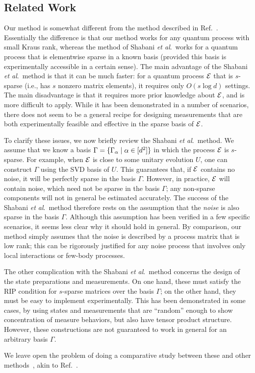 \subsection{Related Work\label{S:process-related-work}}


Our method is somewhat different from the method described in Ref.~\cite{Shabani2011}. Essentially the difference is that our method works for any quantum process with small Kraus rank, whereas the method of Shabani \textit{et al}.\ works for a quantum process that is elementwise sparse in a known basis (provided this basis is experimentally accessible in a certain sense). The main advantage of the Shabani \textit{et al}.\ method is that it can be much faster: for a quantum process $\mathcal{E}$ that is $s$-sparse (i.e., has $s$ nonzero matrix elements), it requires only $O(s\log d)$ settings. The main disadvantage is that it requires more prior knowledge about $\mathcal{E}$, and is more difficult to apply.  While it has been demonstrated in a number of scenarios, there does not seem to be a general recipe for designing measurements that are both experimentally feasible and effective in the sparse basis of $\mathcal{E}$.

To clarify these issues, we now briefly review the Shabani \textit{et al}.\ method.  We assume that we know a basis $\Gamma = \lbrace \Gamma_\alpha \;|\; \alpha \in [d^2] \rbrace$ in which the process $\mathcal{E}$ is $s$-sparse.  For example, when $\mathcal{E}$ is close to some unitary evolution $U$, one can construct $\Gamma$ using the SVD basis of $U$.  This guarantees that, if $\mathcal{E}$ contains no noise, it will be perfectly sparse in the basis $\Gamma$. However, in practice, $\mathcal{E}$ will contain noise, which need not be sparse in the basis $\Gamma$; any non-sparse components will not in general be estimated accurately.  The success of the Shabani \textit{et al}.\ method therefore rests on the assumption that the \textit{noise} is also sparse in the basis $\Gamma$. Although this assumption has been verified in a few specific scenarios, it seems less clear why it should hold in general. By comparison, our method simply assumes that the noise is described by a process matrix that is low rank; this can be rigorously justified for any noise process that involves only local interactions or few-body processes.

The other complication with the Shabani \textit{et al}.\ method concerns the design of the state preparations and measurements. On one hand, these must satisfy the RIP condition for $s$-sparse matrices over the basis $\Gamma$; on the other hand, they must be easy to implement experimentally. This has been demonstrated in some cases, by using states and measurements that are ``random'' enough to show concentration of measure behaviors, but also have tensor product structure. However, these constructions are not guaranteed to work in general for an arbitrary basis $\Gamma$.

We leave open the problem of doing a comparative study between these and other methods~\cite{Mohseni2006,Mohseni2007}, akin to Ref.~\cite{Mohseni2008}.



